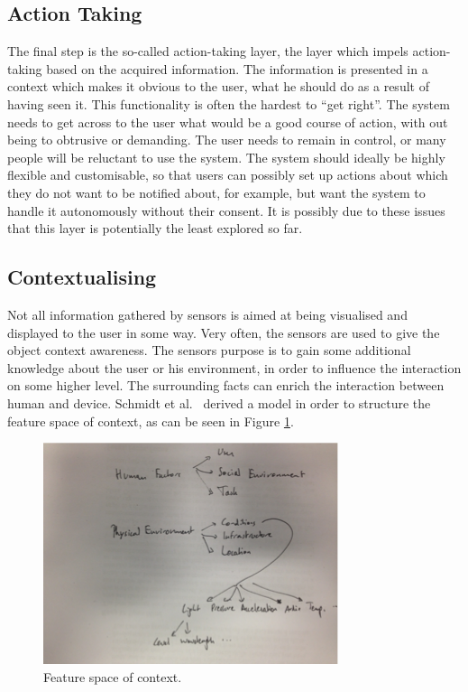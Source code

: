 \subsection{Action Taking}
\label{actionTaking}
The final step is the so-called action-taking layer, the layer which impels action-taking based on the acquired information. 
The information is presented in a context which makes it obvious to the user, what he should do as a result of having seen it.
This functionality is often the hardest to ``get right''. The system needs to get across to the user what would be a good course of action, with out being to obtrusive or demanding. The user needs to remain in control, or many people will be reluctant to use the system. The system should ideally be highly flexible and customisable, so that users can possibly set up actions about which they do not want to be notified about, for example, but want the system to handle it autonomously without their consent. It is possibly due to these issues that this layer is potentially the least explored so far.

\subsection{Contextualising}
Not all information gathered by sensors is aimed at being visualised and displayed to the user in some way. 
Very often, the sensors are used to give the object context awareness.
The sensors purpose is to gain some additional knowledge about the user or his environment, in order to influence the interaction on some higher level. 
The surrounding facts can enrich the interaction between human and device. 
Schmidt et al.\ \cite{schmidt99} derived a model in order to structure the feature space of context, as can be seen in Figure \ref{fig:context}.

\begin{figure}[!t]
	\centering
	\includegraphics[width=0.9\columnwidth]{Images/context}
	\caption{Feature space of context.}
	\label{fig:context}
\end{figure}

